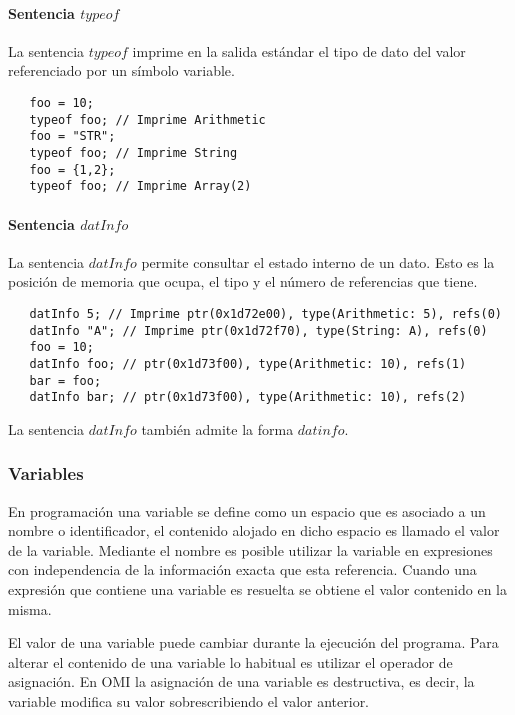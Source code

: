\paragraph{Sentencia $typeof$} \label{sec:stmt_typeof}
La sentencia $typeof$ imprime en la salida estándar el tipo de dato del valor 
referenciado por un símbolo variable. \\

\begin{lstlisting}
   foo = 10;
   typeof foo; // Imprime Arithmetic
   foo = "STR";
   typeof foo; // Imprime String
   foo = {1,2};
   typeof foo; // Imprime Array(2)
\end{lstlisting}


\paragraph{Sentencia $datInfo$} \label{sec:stmt_datInfo}
La sentencia $datInfo$ permite consultar el estado interno de un dato. Esto
es la posición de memoria que ocupa, el tipo y el número de referencias que tiene. \\

\begin{lstlisting}
   datInfo 5; // Imprime ptr(0x1d72e00), type(Arithmetic: 5), refs(0)
   datInfo "A"; // Imprime ptr(0x1d72f70), type(String: A), refs(0)
   foo = 10;
   datInfo foo; // ptr(0x1d73f00), type(Arithmetic: 10), refs(1)
   bar = foo;
   datInfo bar; // ptr(0x1d73f00), type(Arithmetic: 10), refs(2)
\end{lstlisting}

La sentencia $datInfo$ también admite la forma $datinfo$.

\subsubsection{Variables}
En programación una variable se define como un espacio que es asociado a un nombre o identificador, el contenido alojado en dicho espacio es llamado el valor de la variable.
Mediante el nombre es posible utilizar la variable en expresiones con independencia de la información exacta que esta referencia. Cuando una expresión que contiene una variable es resuelta
se obtiene el valor contenido en la misma. 

El valor de una variable puede cambiar durante la ejecución del programa. Para alterar el contenido de una variable lo habitual es utilizar el operador de asignación. 
En OMI la asignación de una variable es destructiva, es decir, la variable modifica su valor sobrescribiendo el valor anterior. 

